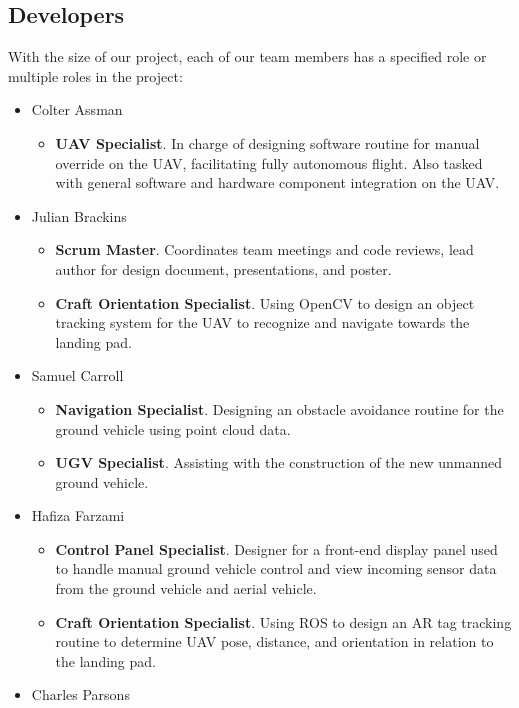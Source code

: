 \subsection{Developers}
With the size of our project, each of our team members has a specified role or multiple roles in the project:
\begin{itemize}
	\item[] Colter Assman
		\begin{itemize}
			\item \textbf{UAV Specialist}. In charge of designing software routine for manual override on the UAV, facilitating fully autonomous flight. Also tasked with general software and hardware component integration on the UAV.
		\end{itemize}
	\item[] Julian Brackins
		\begin{itemize}
			\item \textbf{Scrum Master}. Coordinates team meetings and code reviews, lead author for design document, presentations, and poster.
			\item \textbf{Craft Orientation Specialist}. Using OpenCV to design an object tracking system for the UAV to recognize and navigate towards the landing pad.
		\end{itemize}
	\item[] Samuel Carroll
		\begin{itemize}
			\item \textbf{Navigation Specialist}. Designing an obstacle avoidance routine for the ground vehicle using point cloud data.
			\item \textbf{UGV Specialist}. Assisting with the construction of the new unmanned ground vehicle.
		\end{itemize}
	\item[] Hafiza Farzami
		\begin{itemize}
			\item \textbf{Control Panel Specialist}. Designer for a front-end display panel used to handle manual ground vehicle control and view incoming sensor data from the ground vehicle and aerial vehicle.
			\item  \textbf{Craft Orientation Specialist}. Using ROS to design an AR tag tracking routine to determine UAV pose, distance, and orientation in relation to the landing pad.
		\end{itemize}
	\item[] Charles Parsons

\end{itemize}
